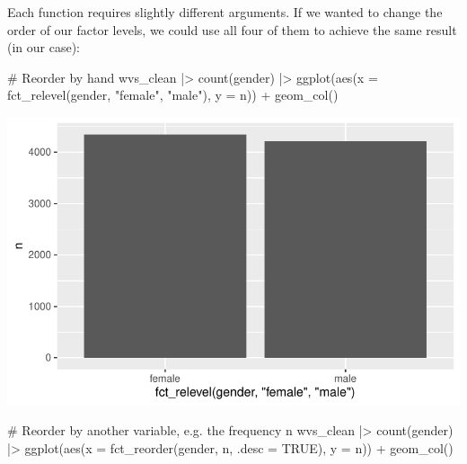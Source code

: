 \documentclass[
  letterpaper,
  DIV=11,
  numbers=noendperiod]{scrreprt}
\newenvironment{Shaded}{\begin{snugshade}}{\end{snugshade}}
\newcommand{\AttributeTok}[1]{\textcolor[rgb]{0.40,0.45,0.13}{#1}}
\newcommand{\CommentTok}[1]{\textcolor[rgb]{0.37,0.37,0.37}{#1}}
\newcommand{\ConstantTok}[1]{\textcolor[rgb]{0.56,0.35,0.01}{#1}}
\newcommand{\FunctionTok}[1]{\textcolor[rgb]{0.28,0.35,0.67}{#1}}
\newcommand{\NormalTok}[1]{\textcolor[rgb]{0.00,0.23,0.31}{#1}}
\newcommand{\SpecialCharTok}[1]{\textcolor[rgb]{0.37,0.37,0.37}{#1}}
\newcommand{\StringTok}[1]{\textcolor[rgb]{0.13,0.47,0.30}{#1}}
\begin{document}
Each function requires slightly different arguments. If we wanted to
change the order of our factor levels, we could use all four of them to
achieve the same result (in our case):

\begin{Shaded}
\begin{Highlighting}[]
\CommentTok{\# Reorder by hand}
\NormalTok{wvs\_clean }\SpecialCharTok{|\textgreater{}}
  \FunctionTok{count}\NormalTok{(gender) }\SpecialCharTok{|\textgreater{}}
  \FunctionTok{ggplot}\NormalTok{(}\FunctionTok{aes}\NormalTok{(}\AttributeTok{x =} \FunctionTok{fct\_relevel}\NormalTok{(gender, }\StringTok{"female"}\NormalTok{, }\StringTok{"male"}\NormalTok{),}
             \AttributeTok{y =}\NormalTok{ n)) }\SpecialCharTok{+}
  \FunctionTok{geom\_col}\NormalTok{()}
\end{Highlighting}
\end{Shaded}

\includegraphics{07_data_wrangling_files/figure-pdf/reorder-factor-levels-forcats-1.pdf}

\begin{Shaded}
\begin{Highlighting}[]
\CommentTok{\# Reorder by another variable, e.g. the frequency \textquotesingle{}n\textquotesingle{}}
\NormalTok{wvs\_clean }\SpecialCharTok{|\textgreater{}}
  \FunctionTok{count}\NormalTok{(gender) }\SpecialCharTok{|\textgreater{}}
  \FunctionTok{ggplot}\NormalTok{(}\FunctionTok{aes}\NormalTok{(}\AttributeTok{x =} \FunctionTok{fct\_reorder}\NormalTok{(gender, n, }\AttributeTok{.desc =} \ConstantTok{TRUE}\NormalTok{),}
             \AttributeTok{y =}\NormalTok{ n)) }\SpecialCharTok{+}
  \FunctionTok{geom\_col}\NormalTok{()}
\end{Highlighting}
\end{Shaded}
\end{document}
